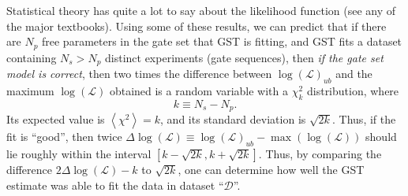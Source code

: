 \documentclass{article}[11pt]
\newcommand{\expec}[1]{\ensuremath{\left\langle#1\right\rangle}}
\begin{document}
Statistical theory has quite a lot to say about the likelihood function (see any of the major textbooks).  Using some of these results, we can predict that if there are $N_p$ free parameters in the gate set that GST is fitting, and GST fits a dataset containing $N_s > N_p$ distinct experiments (gate sequences), then \emph{if the gate set model is correct}, then two times the difference between $\log(\mathcal{L})_{ub}$ and the maximum $\log(\mathcal{L})$ obtained is a random variable with a $\chi^2_{k}$ distribution, where 
$$k \equiv N_s - N_p.$$
Its expected value is $\expec{\chi^2}=k$, and its standard deviation is $\sqrt{2k}$.  Thus, if the fit is ``good'', then twice $\Delta\log(\mathcal{L}) \equiv \log(\mathcal{L})_{ub} - \max(\log(\mathcal{L}))$ should lie roughly within the interval $[k-\sqrt{2k},k+\sqrt{2k}]$.
Thus, by comparing the difference $2\Delta\log(\mathcal{L}) - k$ to $\sqrt{2k}$, one can determine how well the GST estimate was able to fit the data in dataset ``$\mathcal{D}$''.
\end{document}
